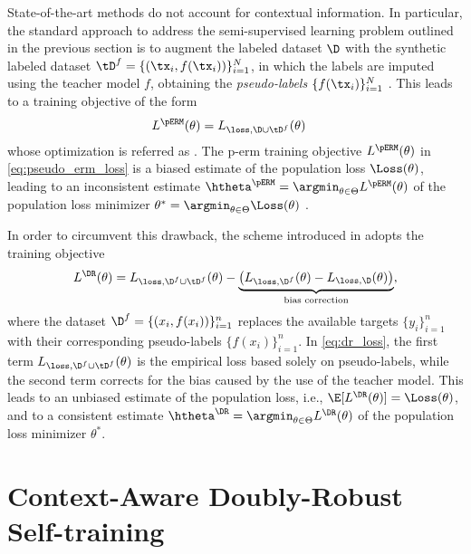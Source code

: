 \documentclass[journal]{IEEEtran}
\begin{document}
State-of-the-art methods do not account for contextual information.
In particular, the standard approach to address the semi-supervised learning problem outlined in the previous section is to augment the labeled dataset $\D$ with the synthetic labeled dataset $\tD^f = \{(\tx_i, f(\tx_i))\}_{i=1}^{N}$, in which the labels are imputed using the teacher model $f$, obtaining the \emph{pseudo-labels} $\{f(\tx_i)\}_{i=1}^{N}$ \cite{amini2025self}.
This leads to a training objective of the form
\begin{equation}
\label{eq:pseudo_erm_loss}
\begin{split}
L^{\pERM}(\theta) 
    &= L_{\loss, \D \cup \tD^f}(\theta) %
\end{split}
\end{equation}
whose optimization is referred as .
The \gls{p-erm} training objective $L^{\pERM}(\theta)$ in \eqref{eq:pseudo_erm_loss} is a biased estimate of the population loss $\Loss(\theta)$, leading to an inconsistent estimate $\htheta^{\pERM} = \argmin_{\theta \in \Theta} L^{\pERM}(\theta)$ of the population loss minimizer $\theta^{*} = \argmin_{\theta \in \Theta} \Loss(\theta)$ \cite[Ch.~5]{van2000asymptotic}.

In order to circumvent this drawback, the  scheme introduced in \cite{zhu2024doubly} adopts the training objective
\begin{equation}
\label{eq:dr_loss}
L^{\DR}(\theta) =
    L_{\loss, \D^f \cup \tD^f}(\theta) -
    \underbrace{
        \left(
            L_{\loss, \D^f}(\theta) -
            L_{\loss, \D}(\theta)
        \right)
    }_{\text{bias correction}},
\end{equation}
where the dataset $\D^f = \{ (x_i, f(x_i)) \}_{i=1}^{n}$ replaces the available targets $\{y _i\}_{i=1}^{n}$ with their corresponding pseudo-labels $\{f(x_i)\}_{i=1}^{n}$.
In \eqref{eq:dr_loss}, the first term $L_{\loss, \D^f \cup \tD^f}(\theta)$ is the empirical loss based solely on pseudo-labels, while the second term corrects for the bias caused by the use of the teacher model.
This leads to an unbiased estimate of the population loss, i.e., $\E[L^{\DR}(\theta)] = \Loss(\theta)$, and to a consistent estimate $\htheta^{\DR} = \argmin_{\theta \in \Theta} L^{\DR}(\theta)$ of the population loss minimizer $\theta^{*}$.


\section{Context-Aware Doubly-Robust Self-training} \label{sec:cdr}
\end{document}
